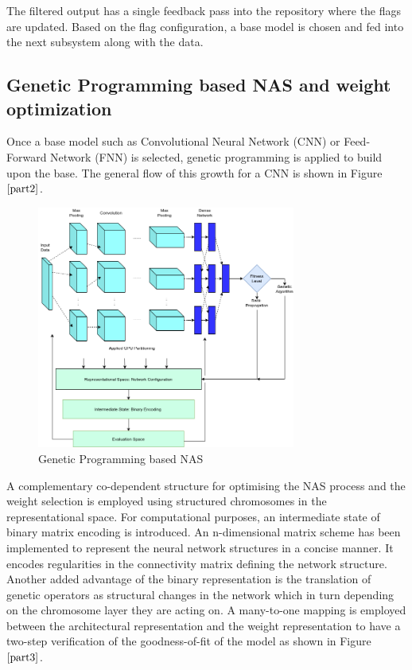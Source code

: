 \documentclass[conference]{IEEEtran}
\begin{document}
The filtered output has a single feedback pass into the repository where the flags are updated. Based on the flag configuration, a base model is chosen and fed into the next subsystem along with the data. 

\subsection{Genetic Programming based NAS and weight optimization}

Once a base model such as Convolutional Neural Network (CNN) or Feed-Forward Network (FNN) is selected, genetic programming is applied to build upon the base. The general flow of this growth for a CNN is shown in Figure $\ref{part2}$. 

\begin{figure}[!b]
\centerline{\includegraphics[width=85mm]{part2.png}}
\caption{Genetic Programming based NAS}
\label{part2}
\end{figure}

A complementary co-dependent structure for optimising the NAS process and the weight selection is employed using structured chromosomes in the representational space. For computational purposes, an intermediate state of binary matrix encoding is introduced. An n-dimensional matrix scheme has been implemented to represent the neural network structures in a concise manner. It encodes regularities in the connectivity matrix defining the network structure. Another added advantage of the binary representation is the translation of genetic operators as structural changes in the network which in turn depending on the chromosome layer they are acting on. A many-to-one mapping is employed between the architectural representation and the weight representation to have a two-step verification of the goodness-of-fit of the model as shown in Figure $\ref{part3}$.
\end{document}
